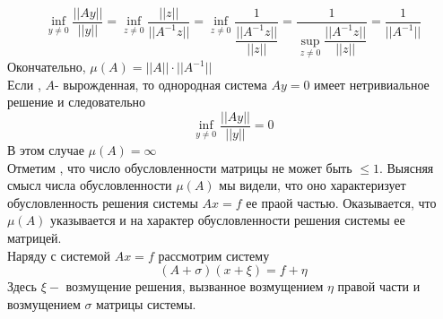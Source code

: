 \documentclass[14pt, titlepage,fleqn]{extarticle}
\begin{document}
	\newpage
	\[\underset{y \neq  0}{\inf} \dfrac{||Ay||}{||y||} = \underset{z \neq  0}{\inf} \dfrac{||z||}{||A^{-1}z||} = \underset{z \neq  0}{\inf} \dfrac{1}{\dfrac{||A^{-1}z||}{||z||}} = \dfrac{1}{\underset{z \neq 0}{\sup}\dfrac{||A^{-1}z||}{||z||}} = \dfrac{1}{||A^{-1}||}\]
	Окончательно, $\mu(A) = ||A||\cdot ||A^{-1}||$\\
	Если , $A$- вырожденная, то однородная система $Ay = 0$ имеет нетривиальное решение и следовательно 
	\[\underset{y \neq 0} {\inf} \dfrac{||Ay||}{||y||} = 0\]
	В этом случае $\mu(A) = \infty$\\
	Отметим , что число обусловленности матрицы не может быть $\leq 1.$
	Выясняя смысл числа обусловленности $\mu(A)$ мы видели, что оно характеризует обусловленность решения системы $Ax = f$ ее праой частью. Оказывается, что $\mu(A)$ указывается и на характер обусловленности решения системы ее матрицей.\\
	Наряду с системой $Ax=f$ рассмотрим систему
	\[(A + \sigma)(x + \xi) = f + \eta\]
	Здесь $\xi - $ возмущение решения, вызванное возмущением $\eta$ правой части и возмущением $\sigma$ матрицы системы.
 	
	




\end{document}
